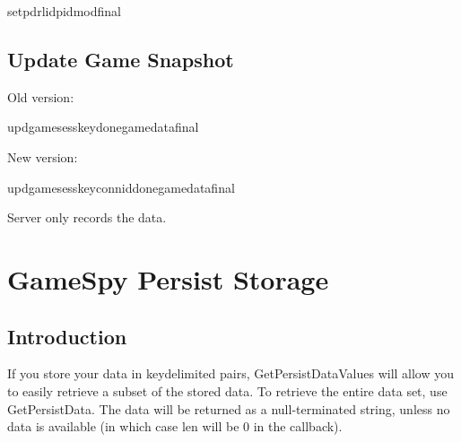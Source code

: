 \documentclass[oneside,titlepage,a4paper]{Definition/retrospy} %
\begin{document}
\begin{mybox}
	\tbs setpdr\tbs<success or fail>\tbs lid\tbs<local id>\tbs pid\tbs <profile id>\tbs mod\tbs <modified time>\tbs final\tbs
\end{mybox}

\section{Update Game Snapshot}
\ClientRequest

Old version:
\begin{mybox}
	\tbs updgame\tbs\tbs sesskey\tbs<session key>\tbs done\tbs<final flag>\tbs gamedata\tbs <game data>\tbs final\tbs
\end{mybox}

New version:
\begin{mybox}
		\tbs updgame\tbs\tbs sesskey\tbs<session key>\tbs connid\tbs<connection id>\tbs done\tbs<final flag>\tbs gamedata\tbs <game data>\tbs final\tbs
\end{mybox}

\ServerResponse

Server only records the data.


\chapter{GameSpy Persist Storage}
\section{Introduction}
If you store your data in key\value delimited pairs, GetPersistDataValues will
allow you to easily retrieve a subset of the stored data. To retrieve the entire
data set, use GetPersistData. The data will be returned as a null-terminated string,
unless no data is available (in which case len will be 0 in the callback).
\end{document}
